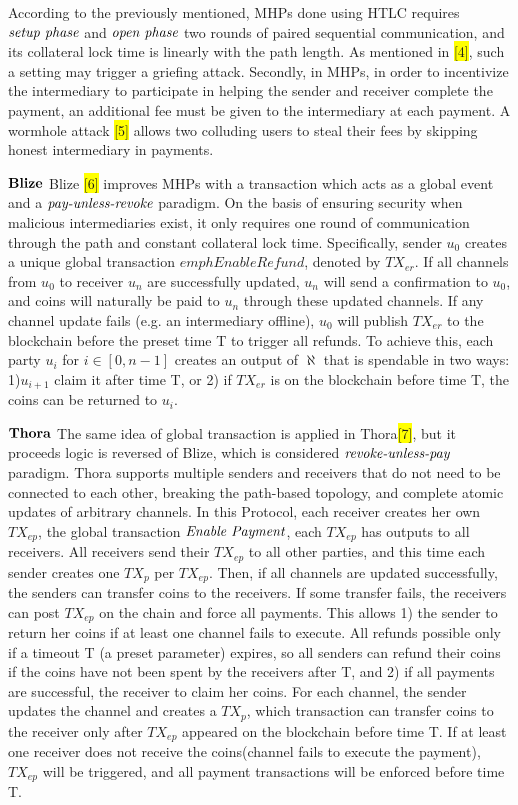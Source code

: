 \documentclass[conference]{IEEEtran}
\begin{document}
According to the previously mentioned, MHPs done using HTLC requires $\emph{setup phase}$ and $\emph{open phase}$ two rounds of paired 
sequential communication, and its collateral lock time is linearly with the path length. As mentioned in \colorbox{yellow}{[4]}, such 
a setting may trigger a griefing attack. Secondly, in MHPs, in order to incentivize the intermediary to participate in helping the sender 
and receiver complete the payment, an additional fee must be given to the intermediary at each payment. A wormhole attack \colorbox{yellow}{[5]} 
allows two colluding users to steal their fees by skipping honest intermediary in payments.

\noindent $\bf{Blize}$   Blize \colorbox{yellow}{[6]} improves MHPs with a transaction which acts as a global event and a 
$\emph{pay-unless-revoke}$ paradigm. On the basis of ensuring security when malicious intermediaries exist, it only requires 
one round of communication through the path and constant collateral lock time. Specifically, sender $u_0$ creates a unique global 
transaction $emph{Enable Refund}$, denoted by $TX_{er}$. If all channels from $u_0$ to receiver $u_n$ are successfully updated, $u_n$ 
will send a confirmation to $u_0$, and coins will naturally be paid to $u_n$ through these updated channels. If any channel update 
fails (e.g. an intermediary offline), $u_0$ will publish $TX_{er}$ to the blockchain before the preset time T to trigger all refunds. 
To achieve this, each party $u_i$ for $i \in [0,n-1]$ creates an output of $\aleph$ that is spendable in two ways: 1)$u_{i+1}$ claim it 
after time T, or 2) if $TX_{er}$ is on the blockchain before time T, the coins can be returned to $u_i$.

\noindent $\bf{Thora}$   The same idea of global transaction is applied in Thora\colorbox{yellow}{[7]}, but it proceeds logic is reversed 
of Blize, which is considered $\emph{revoke-unless-pay}$ paradigm. Thora supports multiple senders and receivers that do not need to be 
connected to each other, breaking the path-based topology, and complete atomic updates of arbitrary channels. In this Protocol, each 
receiver creates her own $TX_{ep}$, the global transaction $\emph{Enable Payment}$, each $TX_{ep}$ has outputs to all receivers. 
All receivers send their $TX_{ep}$ to all other parties, and this time each sender creates one $TX_p$ per $TX_{ep}$. Then, if all 
channels are updated successfully, the senders can transfer coins to the receivers. If some transfer fails, the receivers can post 
$TX_{ep}$ on the chain and force all payments. This allows 1) the sender to return her coins if at least one channel fails to execute. 
All refunds possible only if a timeout T (a preset parameter) expires, so all senders can refund their coins if the coins have not been 
spent by the receivers after T, and 2) if all payments are successful, the receiver to claim her coins. For each channel, the sender 
updates the channel and creates a $TX_p$, which transaction can transfer coins to the receiver only after $TX_{ep}$ appeared on the 
blockchain before time T. If at least one receiver does not receive the coins(channel fails to execute the payment), $TX_{ep}$ will be 
triggered, and all payment transactions will be enforced before time T.
\end{document}
